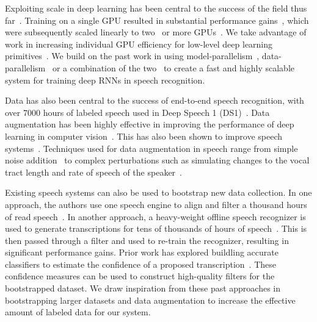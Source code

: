 Exploiting scale in deep learning has been central to the success of the field
thus far~\cite{krizhevsky2012imagenet, le2013}. Training on a single GPU
resulted in substantial performance gains~\cite{raina2009}, which were
subsequently scaled linearly to two~\cite{krizhevsky2012imagenet} or more
GPUs~\cite{coates2013cotshpc}. We take advantage of work in increasing
individual GPU efficiency for low-level deep learning
primitives~\cite{chetlur2014cudnn}. We build on the past work in using
model-parallelism~\cite{coates2013cotshpc}, data-parallelism~\cite{dean2012} or
a combination of the two~\cite{szegedy2015, hannun2014deepspeech} to create a
fast and highly scalable system for training deep RNNs in speech recognition.

Data has also been central to the success of end-to-end speech recognition,
with over 7000 hours of labeled speech used in Deep Speech 1
(DS1)~\cite{hannun2014deepspeech}. Data augmentation has been highly effective
in improving the performance of deep learning in computer
vision~\cite{lecun2004, sapp2008, coates2011}. This has also been shown to
improve speech systems~\cite{gales2009, hannun2014deepspeech}. Techniques used
for data augmentation in speech range from simple noise
addition~\cite{hannun2014deepspeech} to complex perturbations such as
simulating changes to the vocal tract length and rate of speech of the
speaker~\cite{jaitly2013, ko2015}.

Existing speech systems can also be used to bootstrap new data collection. In
one approach, the authors use one speech engine to align and filter a thousand
hours of read speech~\cite{panayotov2015}. In another approach, a heavy-weight
offline speech recognizer is used to generate transcriptions for tens of
thousands of hours of speech~\cite{kapralova2014}. This is then passed through
a filter and used to re-train the recognizer, resulting in significant
performance gains. Prior work has explored buildling accurate classifiers to
estimate the confidence of a proposed transcription~\cite{huang2013,
wessel2001}. These confidence measures can be used to construct high-quality
filters for the bootstrapped dataset. We draw inspiration from these past
approaches in bootstrapping larger datasets and data augmentation to increase
the effective amount of labeled data for our system.
